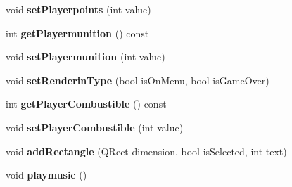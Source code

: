 \begin{DoxyCompactItemize}
\item 
\hypertarget{class_crazy_river_ride_ae422c0571f910c124ed96c680892d19b}{void {\bfseries set\-Playerpoints} (int value)}\label{class_crazy_river_ride_ae422c0571f910c124ed96c680892d19b}

\item 
\hypertarget{class_crazy_river_ride_adab75d641f8df41b15851c0139b37cd3}{int {\bfseries get\-Playermunition} () const }\label{class_crazy_river_ride_adab75d641f8df41b15851c0139b37cd3}

\item 
\hypertarget{class_crazy_river_ride_ae773c56d054fd73adadf6f2ab3e725e1}{void {\bfseries set\-Playermunition} (int value)}\label{class_crazy_river_ride_ae773c56d054fd73adadf6f2ab3e725e1}

\item 
\hypertarget{class_crazy_river_ride_a33d1c49da5c75f486a5a6cf468ea194d}{void {\bfseries set\-Renderin\-Type} (bool is\-On\-Menu, bool is\-Game\-Over)}\label{class_crazy_river_ride_a33d1c49da5c75f486a5a6cf468ea194d}

\item 
\hypertarget{class_crazy_river_ride_a7ff417550948dd28d538e614fd23d91b}{int {\bfseries get\-Player\-Combustible} () const }\label{class_crazy_river_ride_a7ff417550948dd28d538e614fd23d91b}

\item 
\hypertarget{class_crazy_river_ride_ab9d581ecdc75251102d8c243d47fbe00}{void {\bfseries set\-Player\-Combustible} (int value)}\label{class_crazy_river_ride_ab9d581ecdc75251102d8c243d47fbe00}

\item 
\hypertarget{class_crazy_river_ride_aca6033fd6c0387fb97e48bd7ca9a1161}{void {\bfseries add\-Rectangle} (Q\-Rect dimension, bool is\-Selected, int text)}\label{class_crazy_river_ride_aca6033fd6c0387fb97e48bd7ca9a1161}

\item 
\hypertarget{class_crazy_river_ride_a48c19baeb07b2e81d2663adc70ede714}{void {\bfseries playmusic} ()}\label{class_crazy_river_ride_a48c19baeb07b2e81d2663adc70ede714}

\end{DoxyCompactItemize}
